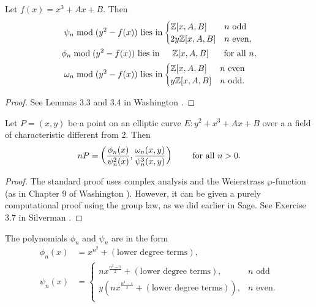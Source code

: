 \begin{lem}
 Let $f(x) = x^3+Ax+B$. Then
\begin{align*}
\psi_{n} \bmod (y^2-f(x)) \text{ lies in} & \begin{cases} \mathbb{Z}[x,A,B] & n \text{ odd}\\
2y\mathbb{Z}[x,A,B] & n \text{ even,}\end{cases}\\
\phi_{n} \bmod (y^2-f(x)) \text{ lies in } & \hspace{4mm} \mathbb{Z}[x,A,B] \hspace{5mm} \text{ for all } n,\\
\omega_{n} \bmod (y^2-f(x)) \text{ lies in} & \begin{cases} \mathbb{Z}[x,A,B] & n \text{ even}\\
y\mathbb{Z}[x,A,B] & n \text{ odd.}\end{cases}
\end{align*}
\end{lem}
\begin{proof} See Lemmas 3.3 and 3.4 in Washington \cite{Wa08}.
\end{proof}

\begin{thm}
Let $P = (x,y)$ be a point on an elliptic curve $E : y^2 +x^3+Ax+B$ over a a field of characteristic different from 2.  Then
\[nP = \left( \frac{\phi_n(x)}{\psi_n^2(x)},\frac{\omega_n(x,y)}{\psi_n^3(x,y)} \right) \hspace{8mm} \text{for all } n >0.\]
\end{thm}

\begin{proof}
The standard proof uses complex analysis and the Weierstrass $\wp$-function (as in Chapter 9 of Washington \cite{Wa08}).
However, it can be given a purely computational proof using the group law, as we did earlier in Sage.
See Exercise 3.7 in Silverman \cite{Si86}.
\end{proof}

\begin{thm}
The polynomials $\phi_n$ and $\psi_n$ are in the form
\begin{align*}
\phi_n(x) & = x^{n^2}+ (\text{lower degree terms}),\\
\psi_n(x) & = \begin{cases} nx^{\frac{n^2-1}{2}} + (\text{lower degree terms}),  & n\text{ odd}\\
y(nx^{\frac{n^2-4}{2}} + (\text{lower degree terms})), & n\text{ even.}\\
\end{cases}
\end{align*}
\end{thm}

